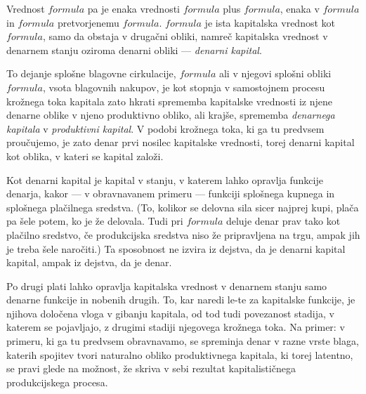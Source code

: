 \documentclass[a5paper]{scrbook}
\begin{document}
Vrednost \( formula \) pa je enaka vrednosti \( formula \) plus \( formula \), enaka v \( formula \) in \( formula \) pretvorjenemu \( formula \). \( formula \) je ista kapitalska vrednost kot \( formula \), samo da obstaja v drugačni obliki, namreč kapitalska vrednost v denarnem stanju oziroma denarni obliki --- \emph{denarni kapital}.

To dejanje splošne blagovne cirkulacije, \( formula \) ali v njegovi splošni obliki \( formula \), vsota blagovnih nakupov, je kot stopnja v samostojnem procesu krožnega toka kapitala zato hkrati sprememba kapitalske vrednosti iz njene denarne oblike v njeno produktivno obliko, ali krajše, sprememba \emph{denarnega kapitala} v \emph{produktivni kapital}. V podobi krožnega toka, ki ga tu predvsem proučujemo, je zato denar prvi nosilec kapitalske vrednosti, torej denarni kapital kot oblika, v kateri se kapital založi.

Kot denarni kapital je kapital v stanju, v katerem lahko opravlja funkcije denarja, kakor --- v obravnavanem primeru --- funkciji splošnega kupnega in splošnega plačilnega sredstva. (To, kolikor se delovna sila sicer najprej kupi, plača pa šele potem, ko je že delovala. Tudi pri \( formula \) deluje denar prav tako kot plačilno sredstvo, če produkcijska sredstva niso že pripravljena na trgu, ampak jih je treba šele naročiti.) Ta sposobnost ne izvira iz dejstva, da je denarni kapital kapital, ampak iz dejstva, da je denar.

Po drugi plati lahko opravlja kapitalska vrednost v denarnem stanju samo denarne funkcije in nobenih drugih. To, kar naredi le-te za kapitalske funkcije, je njihova določena vloga v gibanju kapitala, od tod tudi povezanost stadija, v katerem se pojavljajo, z drugimi stadiji njegovega krožnega toka. Na primer: v primeru, ki ga tu predvsem obravnavamo, se spreminja denar v razne vrste blaga, katerih spojitev tvori naturalno obliko produktivnega kapitala, ki torej latentno, se pravi glede na možnost, že skriva v sebi rezultat kapitalističnega produkcijskega procesa.
\end{document}
